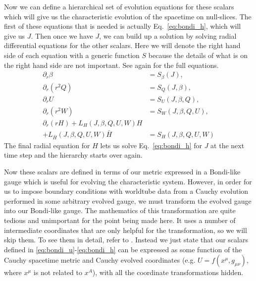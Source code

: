 \begin{bibunit}[unsrtnat]
Now we can define a hierarchical set of evolution equations for these scalars
which will give us the characteristic evolution of the spacetime on null-slices.
The first of these equations that is needed is actually Eq.~\ref{eq:bondi_h},
which will give us $J$. Then once we have $J$, we can build up a solution by
solving radial differential equations for the other scalars. Here we will denote
the right hand side of each equation with a generic function $S$ because the
details of what is on the right hand side are not important. See
\cite{Moxon:2020gha} again for the full equations.
\begin{align}
   \partial_r\beta &= S_\beta(J), \\
   \partial_r (r^2Q) &= S_Q(J,\beta), \\
   \partial_r U &= S_U(J,\beta,Q), \\
   \partial_r (r^2W) &= S_W(J,\beta,Q,U), \\
   \partial_r (rH) + L_H(J,\beta,Q,U,W)H &\nonumber\\
   + L_{\bar{H}}(J,\beta,Q,U,W)\bar{H} &= S_H(J,\beta,Q,U,W)
\end{align}
The final radial equation for $H$ lets us solve Eq.~\ref{eq:bondi_h} for $J$ at
the next time step and the hierarchy starts over again.

Now these scalars are defined in terms of our metric expressed in a Bondi-like
gauge which is useful for evolving the characteristic system. However, in order
for us to impose boundary conditions with worldtube data from a Cauchy evolution
performed in some arbitrary evolved gauge, we
must transform the evolved gauge into our Bondi-like gauge. The mathematics of
this transformation are quite tedious and unimportant for the point being made
here. It uses a number of intermediate coordinates that are only helpful
for the transformation, so we will skip them. To see them in detail, refer to
\cite{Moxon:2020gha}. Instead we just state that our scalars defined in
\ref{eq:bondi_u}-\ref{eq:bondi_h} can be expressed as some function of the
Cauchy spacetime metric and Cauchy evolved coordinates (e.g. $U =
f(x^\mu,g_{\mu\nu})$, where $x^\mu$ is not related to $x^A$), with all the
coordinate transformations hidden.


\end{bibunit}
